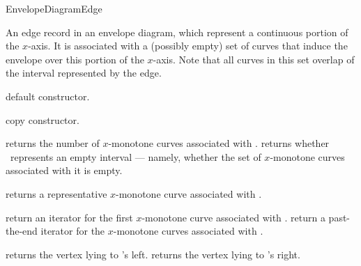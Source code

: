
\ccRefPageBegin

\begin{ccRefConcept}{EnvelopeDiagramEdge}

\ccDefinition

An edge record in an envelope diagram, which represent a continuous portion
of the $x$-axis. It is associated with a (possibly empty) set of curves that
induce the envelope over this portion of the $x$-axis. Note that all curves
in this set overlap of the interval represented by the edge.

\ccTypes



\ccCreation
{}

    {default constructor.}
    
    {copy constructor.}

\ccAccessFunctions

    {returns the number of $x$-monotone curves associated with \ccVar.}
\ccGlue
{}
    {returns whether \ccVar\ represents an empty interval --- namely, whether the set of $x$-monotone curves associated with it is empty.}

    {returns a representative $x$-monotone curve associated with \ccVar.
     }

    {return an iterator for the first $x$-monotone curve associated with \ccVar.}
\ccGlue
{}
    {return a past-the-end iterator for the $x$-monotone curves associated with \ccVar.}

    {returns the vertex lying to \ccVar's left.}
\ccGlue
{}
    {returns the vertex lying to \ccVar's right.}


\end{ccRefConcept}
